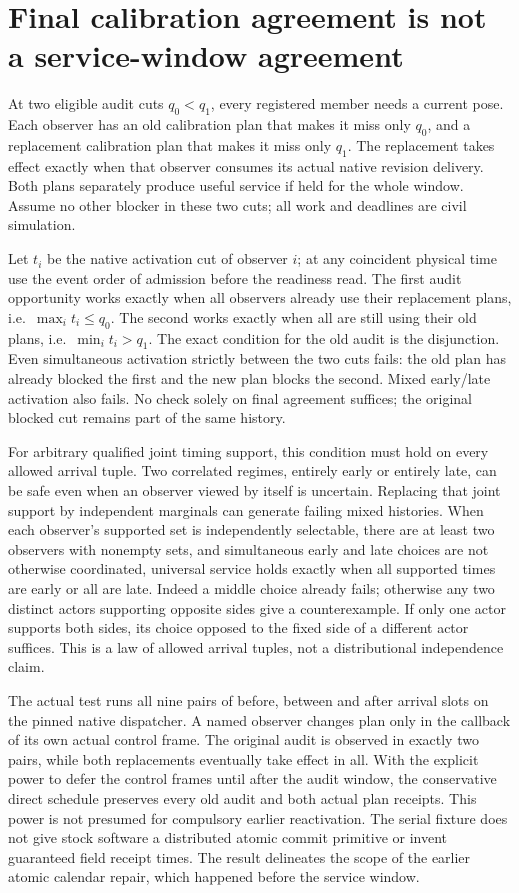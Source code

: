 \documentclass{article}
\begin{document}
\section*{Final calibration agreement is not a service-window agreement}
At two eligible audit cuts \(q_0<q_1\), every registered member
needs a current pose. Each observer has an old calibration plan
that makes it miss only \(q_0\), and a replacement calibration
plan that makes it miss only \(q_1\). The replacement takes
effect exactly when that observer consumes its actual native
revision delivery. Both plans separately produce useful service
if held for the whole window. Assume no other blocker in
these two cuts; all work and deadlines are civil simulation.

Let \(t_i\) be the native activation cut of observer \(i\); at any
coincident physical time use the event order of admission before
the readiness read. The first audit opportunity works exactly
when all observers already use their replacement plans, i.e.\
\(\max_i t_i\le q_0\). The second works exactly when all are
still using their old plans, i.e.\ \(\min_i t_i>q_1\).
The exact condition for the old audit is the disjunction.
Even simultaneous activation strictly between the two cuts
fails: the old plan has already blocked the first and the new
plan blocks the second. Mixed early/late activation also fails.
No check solely on final agreement suffices; the original
blocked cut remains part of the same history.

For arbitrary qualified joint timing support, this condition
must hold on every allowed arrival tuple. Two correlated
regimes, entirely early or entirely late, can be safe even
when an observer viewed by itself is uncertain. Replacing that
joint support by independent marginals can generate failing
mixed histories. When each observer's supported set is
independently selectable, there are at least two observers
with nonempty sets, and simultaneous early and late choices
are not otherwise coordinated, universal service holds exactly
when all supported times are early or all are late.
Indeed a middle choice already fails; otherwise any two
distinct actors supporting opposite sides give a counterexample.
If only one actor supports both sides, its choice opposed to the
fixed side of a different actor suffices. This is a law of
allowed arrival tuples, not a distributional independence claim.

The actual test runs all nine pairs of before, between and
after arrival slots on the pinned native dispatcher. A named
observer changes plan only in the callback of its own actual
control frame. The original audit is observed in exactly two
pairs, while both replacements eventually take effect in all.
With the explicit power to defer the control frames until
after the audit window, the conservative direct schedule
preserves every old audit and both actual plan receipts.
This power is not presumed for compulsory earlier reactivation.
The serial fixture does not give stock software a distributed
atomic commit primitive or invent guaranteed field receipt
times. The result delineates the scope of the earlier atomic
calendar repair, which happened before the service window.
\end{document}
